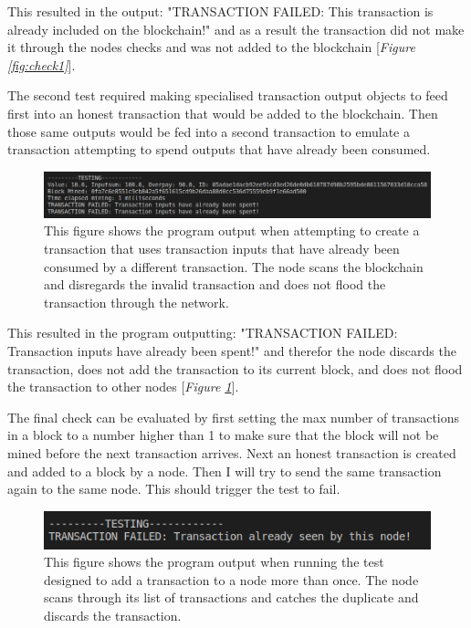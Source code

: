 \documentclass{l4proj}
\begin{document}
This resulted in the output: "TRANSACTION FAILED: This transaction is already included on the blockchain!" and as
a result the transaction did not make it through the nodes checks and was not added to the blockchain [\textit{Figure \ref{fig:check1}}].

The second test required making specialised transaction output objects to feed first into an honest transaction that
would be added to the blockchain. Then those same outputs would be fed into a second transaction to emulate a
transaction attempting to spend outputs that have already been consumed.

\begin{figure}[!ht]
    \centering
    \includegraphics[width=1\linewidth]{images/inputsspent.png}    
    \caption
    {
        This figure shows the program output when attempting to create a transaction that uses transaction inputs
        that have already been consumed by a different transaction. The node scans the blockchain and disregards the
        invalid transaction and does not flood the transaction through the network.
    }
    \label{fig:inputsspent}
\end{figure}

This resulted in the program outputting: "TRANSACTION FAILED: Transaction inputs have already been spent!" and
therefor the node discards the transaction, does not add the transaction to its current block, and does not flood
the transaction to other nodes [\textit{Figure \ref{fig:inputsspent}}].

The final check can be evaluated by first setting the max number of transactions in a block to a number higher than
1 to make sure that the block will not be mined before the next transaction arrives. Next an honest transaction is 
created and added to a block by a node. Then I will try to send the same transaction again to the same node. This
should trigger the test to fail.

\begin{figure}[!ht]
    \centering
    \includegraphics[width=1\linewidth]{images/seenbynode.png}    
    \caption
    {
        This figure shows the program output when running the test designed to add a transaction to a node more than
        once. The node scans through its list of transactions and catches the duplicate and discards the transaction.
    }
    \label{fig:seenbynode} 
\end{figure}
\end{document}
